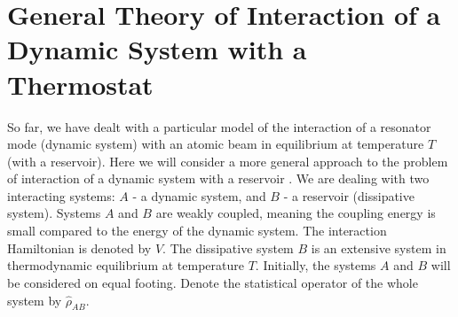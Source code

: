 \section{General Theory of Interaction of a Dynamic System with a Thermostat}

So far, we have dealt with a particular model of the interaction of a resonator mode (dynamic system) with an atomic beam in equilibrium at temperature $T$ (with a reservoir). Here we will consider a more general approach to the problem of interaction of a dynamic system with a reservoir \cite{bLaks1974}. We are dealing with two interacting systems: $A$ - a dynamic system, and $B$ - a reservoir (dissipative system). Systems $A$ and $B$ are weakly coupled, meaning the coupling energy is small compared to the energy of the dynamic system. The interaction Hamiltonian is denoted by $\hat{V}$. The dissipative system $B$ is an extensive system in thermodynamic equilibrium at temperature $T$. Initially, the systems $A$ and $B$ will be considered on equal footing. Denote the statistical operator of the whole system by $\hat{\rho}_{AB}$. 


